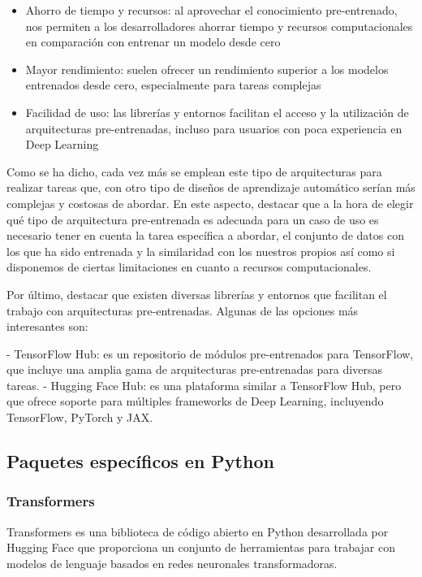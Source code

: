 \documentclass[
  a4paper,
  DIV=11,
  numbers=noendperiod]{scrreprt}
\providecommand{\tightlist}{%
  \setlength{\itemsep}{0pt}\setlength{\parskip}{0pt}}\usepackage{longtable,booktabs,array}
\begin{document}
\begin{itemize}
\tightlist
\item
  Ahorro de tiempo y recursos: al aprovechar el conocimiento
  pre-entrenado, nos permiten a los desarrolladores ahorrar tiempo y
  recursos computacionales en comparación con entrenar un modelo desde
  cero
\item
  Mayor rendimiento: suelen ofrecer un rendimiento superior a los
  modelos entrenados desde cero, especialmente para tareas complejas
\item
  Facilidad de uso: las librerías y entornos facilitan el acceso y la
  utilización de arquitecturas pre-entrenadas, incluso para usuarios con
  poca experiencia en Deep Learning
\end{itemize}

Como se ha dicho, cada vez más se emplean este tipo de arquitecturas
para realizar tareas que, con otro tipo de diseños de aprendizaje
automático serían más complejas y costosas de abordar. En este aspecto,
destacar que a la hora de elegir qué tipo de arquitectura pre-entrenada
es adecuada para un caso de uso es necesario tener en cuenta la tarea
específica a abordar, el conjunto de datos con los que ha sido entrenada
y la similaridad con los nuestros propios así como si disponemos de
ciertas limitaciones en cuanto a recursos computacionales.

Por último, destacar que existen diversas librerías y entornos que
facilitan el trabajo con arquitecturas pre-entrenadas. Algunas de las
opciones más interesantes son:

- TensorFlow Hub: es un repositorio de módulos pre-entrenados para
TensorFlow, que incluye una amplia gama de arquitecturas pre-entrenadas
para diversas tareas. - Hugging Face Hub: es una plataforma similar a
TensorFlow Hub, pero que ofrece soporte para múltiples frameworks de
Deep Learning, incluyendo TensorFlow, PyTorch y JAX.

\subsection{Paquetes específicos en
Python}\label{paquetes-especuxedficos-en-python}

\subsubsection{Transformers}\label{transformers}

Transformers es una biblioteca de código abierto en Python desarrollada
por Hugging Face que proporciona un conjunto de herramientas para
trabajar con modelos de lenguaje basados en redes neuronales
transformadoras.
\end{document}
